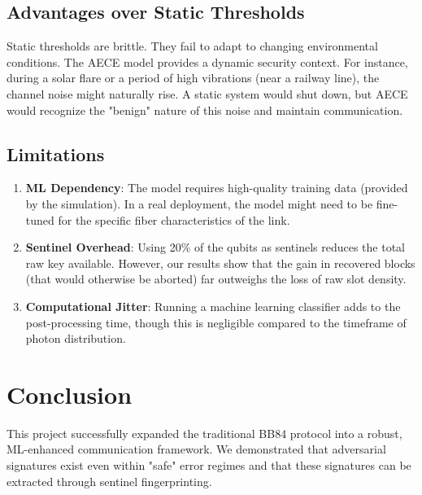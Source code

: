 \documentclass[journal,onecolumn,12pt,draftclsnofoot]{IEEEtran}
\begin{document}
\subsection{Advantages over Static Thresholds}
Static thresholds are brittle. They fail to adapt to changing environmental conditions. The AECE model provides a dynamic security context. For instance, during a solar flare or a period of high vibrations (near a railway line), the channel noise might naturally rise. A static system would shut down, but AECE would recognize the "benign" nature of this noise and maintain communication.

\subsection{Limitations}
\begin{enumerate}
    \item \textbf{ML Dependency}: The model requires high-quality training data (provided by the simulation). In a real deployment, the model might need to be fine-tuned for the specific fiber characteristics of the link.
    \item \textbf{Sentinel Overhead}: Using 20\% of the qubits as sentinels reduces the total raw key available. However, our results show that the gain in recovered blocks (that would otherwise be aborted) far outweighs the loss of raw slot density.
    \item \textbf{Computational Jitter}: Running a machine learning classifier adds to the post-processing time, though this is negligible compared to the timeframe of photon distribution.
\end{enumerate}

\newpage

\section{Conclusion}

This project successfully expanded the traditional BB84 protocol into a robust, ML-enhanced communication framework. We demonstrated that adversarial signatures exist even within "safe" error regimes and that these signatures can be extracted through sentinel fingerprinting.
\end{document}
